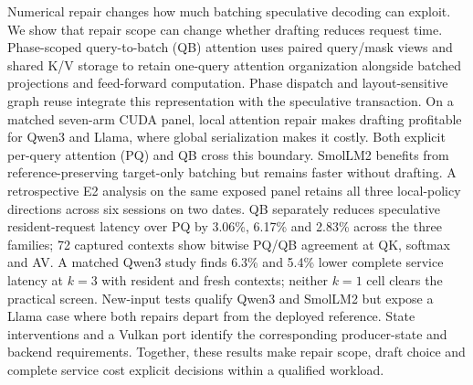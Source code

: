 Numerical repair changes how much batching speculative decoding can exploit. We show that repair scope can change whether drafting reduces request time. Phase-scoped query-to-batch (QB) attention uses paired query/mask views and shared K/V storage to retain one-query attention organization alongside batched projections and feed-forward computation. Phase dispatch and layout-sensitive graph reuse integrate this representation with the speculative transaction. On a matched seven-arm CUDA panel, local attention repair makes drafting profitable for Qwen3 and Llama, where global serialization makes it costly. Both explicit per-query attention (PQ) and QB cross this boundary. SmolLM2 benefits from reference-preserving target-only batching but remains faster without drafting. A retrospective E2 analysis on the same exposed panel retains all three local-policy directions across six sessions on two dates. QB separately reduces speculative resident-request latency over PQ by 3.06\%, 6.17\% and 2.83\% across the three families; 72 captured contexts show bitwise PQ/QB agreement at QK, softmax and AV. A matched Qwen3 study finds 6.3\% and 5.4\% lower complete service latency at $k=3$ with resident and fresh contexts; neither $k=1$ cell clears the practical screen. New-input tests qualify Qwen3 and SmolLM2 but expose a Llama case where both repairs depart from the deployed reference. State interventions and a Vulkan port identify the corresponding producer-state and backend requirements. Together, these results make repair scope, draft choice and complete service cost explicit decisions within a qualified workload.
